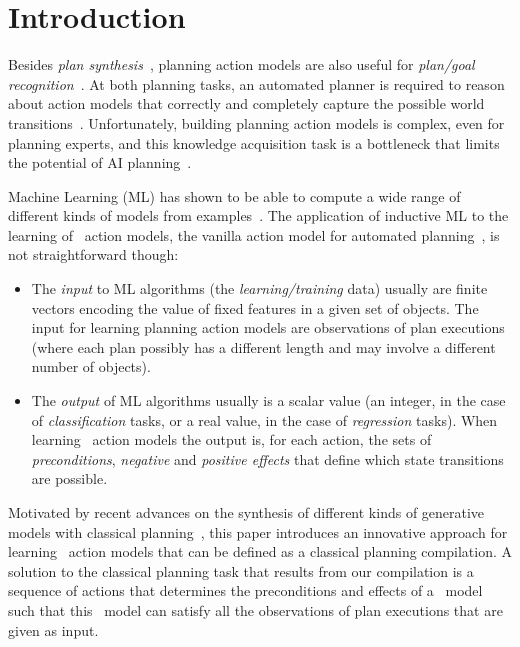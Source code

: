 
\section{Introduction}
\label{sec:Section1}

Besides {\em plan synthesis}~\cite{ghallab2004automated}, planning action models are also useful for {\em plan/goal recognition}~\cite{ramirez2012plan}. At both planning tasks, an automated planner is required to reason about action models that correctly and completely capture the possible world transitions~\cite{geffner:book:2013}. Unfortunately, building planning action models is complex, even for planning experts, and this knowledge acquisition task is a bottleneck that limits the potential of AI planning~\cite{kambhampati:modellite:AAAI2007}.

Machine Learning (ML) has shown to be able to compute a wide range of different kinds of models from examples~\cite{michalski2013machine}. The application of inductive ML to the learning of \strips\ action models, the vanilla action model for automated planning~\cite{fikes1971strips}, is not straightforward though:
\begin{itemize}
\item The {\em input} to ML algorithms (the {\em learning/training} data) usually are finite vectors encoding the value of fixed features in a given set of objects. The input for learning planning action models are observations of plan executions (where each plan possibly has a different length and may involve a different number of objects).
\item The {\em output} of ML algorithms usually is a scalar value (an integer, in the case of {\em classification} tasks, or a real value, in the case of {\em regression} tasks). When learning \strips\ action models the output is, for each action, the sets of {\em preconditions}, {\em negative} and {\em positive effects} that define which state transitions are possible.
\end{itemize}

Motivated by recent advances on the synthesis of different kinds of generative models with classical planning~\cite{bonet2009automatic,segovia2016generalized,segovia2016hierarchical,segovia2017generating}, this paper introduces an innovative approach for learning \strips\ action models that can be defined as a classical planning compilation. A solution to the classical planning task that results from our compilation is a sequence of actions that determines the preconditions and effects of a \strips\ model such that this \strips\ model can satisfy all the observations of plan executions that are given as input.

